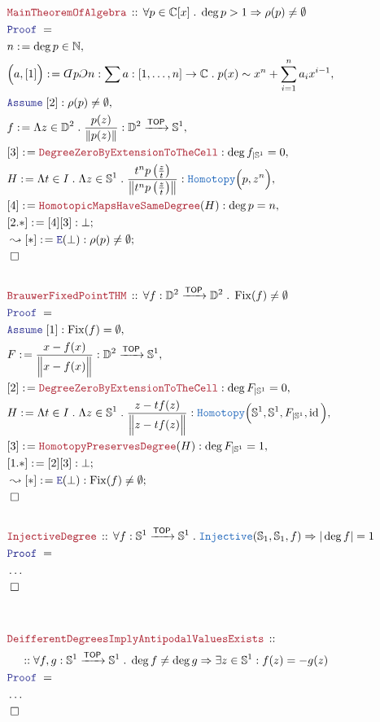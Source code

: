 \documentclass[12pt]{scrartcl}
\newcommand{\TYPE}[1]{\textcolor{NavyBlue}{\mathtt{#1}}}
\newcommand{\LOGIC}[1]{\textcolor{Blue}{\mathtt{#1}}}
\newcommand{\THM}[1]{\textcolor{Maroon}{\mathtt{#1}}}
\renewcommand{\.}{\; . \;}
\newcommand{\de}{: \kern 0.1pc =}
\newcommand{\Theorem}[2]{& \THM{#1} \, :: \, #2 \\ & \Proof = \\ }
\newcommand{\NewLine}{\\ & \kern 1pc}
\newcommand{\Page}[1]{ \begin{align*} #1 \end{align*}   }
\newcommand{ \bd }{ \ByDef }
\newcommand{\NoProof}{ & \ldots \\ \EndProof}
\newcommand{\Imply}{\Rightarrow}
\newcommand{\Elim}{\LOGIC{E}}
\newcommand{\Complex}{\mathbb{C}}
\newcommand{\Sphere}{\mathbb{S}}
\newcommand{\Nat}{\mathbb{N} }
\DeclareMathOperator*{\id}{id}
\newcommand{\Arrow}{\xrightarrow}
\newcommand{\Say}[3]{& #1 \de #2 : #3, \\}
\newcommand{\SayIn}[3]{& #1 \de #2 \in #3, \\}
\newcommand{\Conclude}[3]{& #1 \de #2 : #3; \\}
\newcommand{\DeriveConclude}[3]{& \leadsto #1 \de #2 : #3 ; \\}
\newcommand{\Assume}[2]{& \LOGIC{Assume} \; #1 : #2, \\}
\newcommand{\QED}{\; \square}
\newcommand{\EndProof}{& \QED \\}
\newcommand{\ByDef}{\rotatebox[origin=c]{-180}{$D$}}%
\newcommand{\ByConstr}{\rotatebox[origin=c]{-180}{$C$}}%
\newcommand{\Proof}{\LOGIC{Proof} \; }
\newcommand{\TOP}{\mathsf{TOP}}
\DeclareMathOperator{\Fix}{Fix}
\begin{document}
\Page{ 
	\Theorem{MainTheoremOfAlgebra}
	{
		\forall p \in \Complex[x] \.
		\deg p > 1 \Imply \rho(p) \neq \emptyset
	}
	\SayIn{n}{\deg p}{\Nat}
	\Say{\Big(a, [1] \Big)}{\bd p \ByConstr n}
	{
		\sum a : [1,\ldots,n] \to \Complex \.
		p(x) \sim  x^n + \sum^n_{i=1} a_i x^{i-1}
	}
	\Assume{[2]}{\rho(p) \neq \emptyset}
	\Say{f}{\Lambda z \in \mathbb{D}^2 \. \frac{p(z)}{\| p(z)\|}}
	{
		\mathbb{D}^2 \Arrow{\TOP} \Sphere^1
	}
	\Say{[3]}{\THM{DegreeZeroByExtensionToTheCell}}{\deg f_{|\Sphere^1} = 0}
	\Say{H}{
		\Lambda t \in I \. 
		\Lambda z \in \Sphere^1 \.  
		\frac{t^n p\left( \frac{z}{t} \right)}
		{
			\left\|
				t^n p\left( \frac{z}{t} \right)
			\right\|
		}
	}
	{
		\TYPE{Homotopy}\Big( p, z^n \Big)
	}
	\Say{[4]}{\THM{HomotopicMapsHaveSameDegree}(H)}
	{
		\deg p = n
	}
	\Conclude{[2.*]}{[4][3]}
	{
		\bot
	}
	\DeriveConclude{[*]}{\Elim(\bot)}
	{
		\rho(p) \neq \emptyset
	}
	\EndProof
	\\
	\Theorem{BrauwerFixedPointTHM}{
		\forall f : \mathbb{D}^2 \Arrow{\TOP} \mathbb{D}^2 \.
		\Fix(f) \neq \emptyset
	}
	\Assume{[1]}{\Fix(f) = \emptyset}
	\Say{F}{\frac{x-f(x)}{\Big\|x-f(x)\Big\|}}
	{
		\mathbb{D}^2 \Arrow{\TOP} \Sphere^1
	}
	\Say{[2]}{\THM{DegreeZeroByExtensionToTheCell}}{\deg F_{|\Sphere^1} = 0}
	\Say{H}{\Lambda t \in I \. \Lambda z \in \Sphere^1 \.  \frac{z - tf(z)}{\Big\| z - tf(z)\Big\|}}
	{
		\TYPE{Homotopy}\Big( \Sphere^1,\Sphere^1, F_{|\Sphere^1}, \id \Big)
	}
	\Say{[3]}{\THM{HomotopyPreservesDegree}(H)}{\deg F_{|\Sphere^1} = 1}
	\Conclude{[1.*]}{[2][3]}{\bot}
	\DeriveConclude{[*]}{\Elim(\bot)}{\Fix(f) \neq \emptyset}
	\EndProof
	\\
	\Theorem{InjectiveDegree}
	{
		\forall f : \Sphere^1 \Arrow{\TOP} \Sphere^1 \.
		\TYPE{Injective}(\Sphere_1,\Sphere_1,f) \Imply |\deg f| = 1
	}
	\NoProof
	\\
	\\
	\Theorem{DeifferentDegreesImplyAntipodalValuesExists}
	{
		\NewLine ::
		\forall f ,g : \Sphere^1 \Arrow{\TOP} \Sphere^1 \.
		\deg f \neq \deg g \Imply \exists z \in \Sphere^1 : f(z) = -g(z)
	}
	\NoProof
}
\newpage
\end{document}
